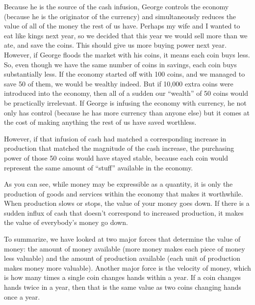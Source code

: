 \documentclass[letterpaper]{article}
\begin{document}
{\color{black}
Because he is the source of the cash infusion, George controls the
economy (because he is the originator of the currency) and
simultaneously reduces the value of all of the money the rest of us
have. Perhaps my wife and I wanted to eat like kings next year, so we
decided that this year we would sell more than we ate, and save the
coins. This should give us more buying power next year. However, if
George floods the market with his coins, it means each coin buys less.
So, even though we have the same number of coins in savings, each coin
buys substantially less. If the economy started off with 100 coins, and
we managed to save 50 of them, we would be wealthy indeed. But if
10,000 extra coins were introduced into the economy, then all of a
sudden our “wealth” of 50 coins would be practically irrelevant. If
George is infusing the economy with currency, he not only has control
(because he has more currency than anyone else) but it comes at the
cost of making anything the rest of us have saved worthless. }

{\color{black}
However, if that infusion of cash had matched a corresponding increase
in production that matched the magnitude of the cash increase, the
purchasing power of those 50 coins would have stayed stable, because
each coin would represent the same amount of “stuff” available in the
economy.}

{\color{black}
As you can see, while money may be expressible as a quantity, it is only
the production of goods and services within the economy that makes it
worthwhile. When production slows or stops, the value of your money
goes down. If there is a sudden influx of cash that doesn’t correspond
to increased production, it makes the value of everybody’s money go
down. }

{\color{black}
\textcolor[rgb]{0.32941177,0.5529412,0.83137256}{To summarize,} we have
looked at two major forces that determine the value of money: the
amount of money available (more money makes each piece of money less
valuable) and the amount of production available (each unit of
production makes money more valuable). Another major force is the
velocity of money, which is how many times a single coin changes hands
within a year. If a coin changes hands twice in a year, then that is
the same value as two coins changing hands once a year.}
\end{document}
